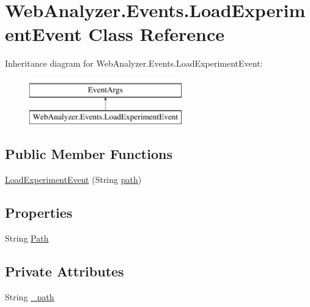 \hypertarget{class_web_analyzer_1_1_events_1_1_load_experiment_event}{}\section{Web\+Analyzer.\+Events.\+Load\+Experiment\+Event Class Reference}
\label{class_web_analyzer_1_1_events_1_1_load_experiment_event}
Inheritance diagram for Web\+Analyzer.\+Events.\+Load\+Experiment\+Event\+:\begin{figure}[H]
\begin{center}
\leavevmode
\includegraphics[height=2.000000cm]{class_web_analyzer_1_1_events_1_1_load_experiment_event}
\end{center}
\end{figure}
\subsection*{Public Member Functions}
\begin{DoxyCompactItemize}
\item 
\hyperlink{class_web_analyzer_1_1_events_1_1_load_experiment_event_a359c2a5d88c60ad3f993c43984b375a9}{Load\+Experiment\+Event} (String \hyperlink{bin_2x64_2_release_2_u_i_2_h_t_m_l_resources_2js_2src_2create__experiment_8js_aa72e0c8a20e6bcc571d3a1c51846e627}{path})
\end{DoxyCompactItemize}
\subsection*{Properties}
\begin{DoxyCompactItemize}
\item 
String \hyperlink{class_web_analyzer_1_1_events_1_1_load_experiment_event_ac86cf22d02cb0c13c9ea9437422b5142}{Path}
\end{DoxyCompactItemize}
\subsection*{Private Attributes}
\begin{DoxyCompactItemize}
\item 
String \hyperlink{class_web_analyzer_1_1_events_1_1_load_experiment_event_ae8805e9e6076aad4f485c959c9f7eb54}{\+\_\+path}
\end{DoxyCompactItemize}


